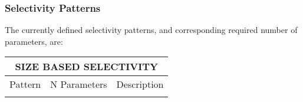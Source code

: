 \hypertarget{SelexPattern}{}
\subsubsection{Selectivity Patterns}
The currently defined selectivity patterns, and corresponding required number of parameters, are:


\begin{longtable}{p{2cm} p{3cm} p{10cm}}
	\multicolumn{3}{c}{SIZE BASED SELECTIVITY}\Bstrut\\	
	\endfirsthead

	\hline
	Pattern & N Parameters & Description \Tstrut\Bstrut\\
	\hline
	\endhead

	\hline
	\endfoot
	\endlastfoot

	\hline
		

\end{longtable}
